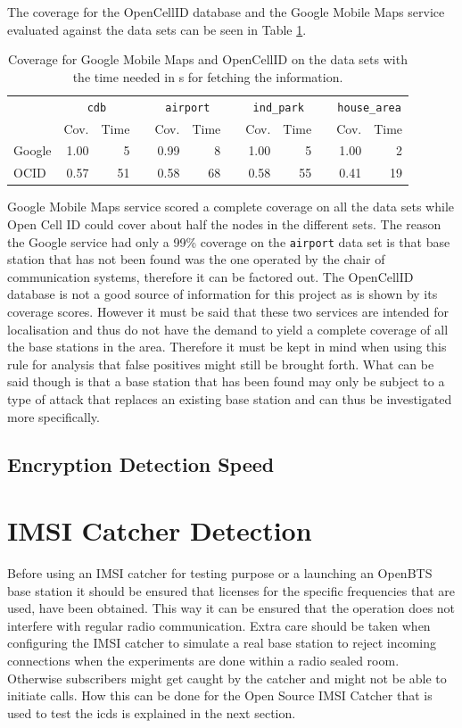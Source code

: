 The coverage for the OpenCellID database and the Google Mobile Maps service evaluated against the data sets can be seen in Table \ref{tab:coverage}.
\begin{table}
\centering
\begin{tabular}{lrrcrrcrrcrr}
\toprule
& \multicolumn{2}{c}{\texttt{cdb}} &\phantom{a}& \multicolumn{2}{c}{\texttt{airport}} &\phantom{a} & \multicolumn{2}{c}{\texttt{ind\_park}}&\phantom{a} & \multicolumn{2}{c}{\texttt{house\_area}}\\
\cmidrule{2-3} \cmidrule{5-6} \cmidrule{8-9} \cmidrule{11-12}
&Cov.&Time&	&Cov.&Time&	&Cov.&Time&	&Cov.&Time\\
\midrule
Google&		1.00&5&	&0.99&8&	&1.00&5&	&1.00&2\\
OCID&		0.57&51&	&0.58&68&	&0.58&55&	&0.41&19\\
\bottomrule
\end{tabular}
\caption{Coverage for Google Mobile Maps and OpenCellID on the data sets with the time needed in s for fetching the information.}
\label{tab:coverage}
\end{table}
Google Mobile Maps service scored a complete coverage on all the data sets while Open Cell ID could cover about half the nodes in the different sets.
The reason the Google service had only a 99\% coverage on the \texttt{airport} data set is that base station that has not been found was the one operated by the chair of communication systems, therefore it can be factored out.
The OpenCellID database is not a good source of information for this project as is shown by its coverage scores.
However it must be said that these two services are intended for localisation and thus do not have the demand to yield a complete coverage of all the base stations in the area.
Therefore it must be kept in mind when using this rule for analysis that false positives might still be brought forth.
What can be said though is that a base station that has been found may only be subject to a type of attack that replaces an existing base station and can thus be investigated more specifically.

\subsection{Encryption Detection Speed}

\section{IMSI Catcher Detection}
Before using an IMSI catcher for testing purpose or a launching an OpenBTS base station it should be ensured that licenses for the specific frequencies that are used, have been obtained.
This way it can be ensured that the operation does not interfere with regular radio communication.
Extra care should be taken when configuring the IMSI catcher to simulate a real base station to reject incoming connections when the experiments are done within a radio sealed room.
Otherwise subscribers might get caught by the catcher and might not be able to initiate calls.
How this can be done for the Open Source IMSI Catcher that is used to test the \gls{icds} is explained in the next section.

